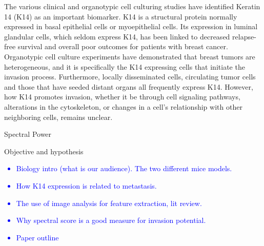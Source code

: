 \documentclass[10pt,letterpaper]{article}
\begin{document}
The various clinical and organotypic cell culturing studies have identified Keratin 14 (K14) as an important biomarker. K14 is a structural protein normally expressed in basal epithelial cells or myoepithelial cells. Its expression in luminal glandular cells, which seldom express K14, has been linked to decreased relapse-free survival and overall poor outcomes for patients with breast cancer\cite{Gusterson:2005bc,Laakso:2006blc}. Organotypic cell culture experiments have demonstrated that breast tumors are heterogeneous, and it is specifically the K14 expressing cells that initiate the invasion process. Furthermore, locally disseminated cells, circulating tumor cells and those that have seeded distant organs all frequently express K14\cite{Cheung:2013ci,Cheung:2016pcb}. However, how K14 promotes invasion, whether it be through cell signaling pathways, alterations in the cytoskeleton, or changes in a cell's relationship with other neighboring cells, remains unclear.




Spectral Power

Objective and hypothesis



\textcolor{blue}{
\begin{itemize}
    \item Biology intro (what is our audience). The two different mice models.
    \item How K14 expression is related to metastasis.
    \item The use of image analysis for feature extraction, lit review.
    \item Why spectral score is a good measure for invasion potential.
    \item Paper outline
\end{itemize}
}
\end{document}

